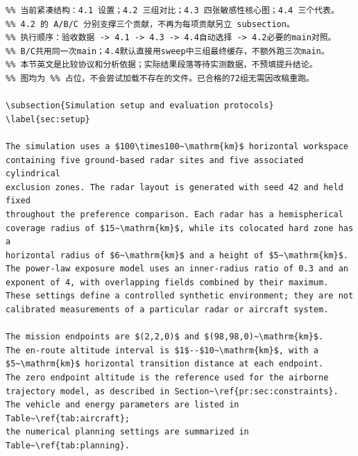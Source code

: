 \documentclass[12pt]{article}
\begin{document}
\begin{verbatim}
%% 当前紧凑结构：4.1 设置；4.2 三组对比；4.3 四张敏感性核心图；4.4 三个代表。
%% 4.2 的 A/B/C 分别支撑三个贡献，不再为每项贡献另立 subsection。
%% 执行顺序：验收数据 -> 4.1 -> 4.3 -> 4.4自动选择 -> 4.2必要的main对照。
%% B/C共用同一次main；4.4默认直接用sweep中三组最终缓存，不额外跑三次main。
%% 本节英文是比较协议和分析依据；实际结果段落等待实测数据，不预填提升结论。
%% 图均为 %% 占位，不会尝试加载不存在的文件。已合格的72组无需因改稿重跑。

\subsection{Simulation setup and evaluation protocols}
\label{sec:setup}

The simulation uses a $100\times100~\mathrm{km}$ horizontal workspace
containing five ground-based radar sites and five associated cylindrical
exclusion zones. The radar layout is generated with seed 42 and held fixed
throughout the preference comparison. Each radar has a hemispherical
coverage radius of $15~\mathrm{km}$, while its colocated hard zone has a
horizontal radius of $6~\mathrm{km}$ and a height of $5~\mathrm{km}$.
The power-law exposure model uses an inner-radius ratio of 0.3 and an
exponent of 4, with overlapping fields combined by their maximum.
These settings define a controlled synthetic environment; they are not
calibrated measurements of a particular radar or aircraft system.

The mission endpoints are $(2,2,0)$ and $(98,98,0)~\mathrm{km}$.
The en-route altitude interval is $1$--$10~\mathrm{km}$, with a
$5~\mathrm{km}$ horizontal transition distance at each endpoint.
The zero endpoint altitude is the reference used for the airborne
trajectory model, as described in Section~\ref{pr:sec:constraints}.
The vehicle and energy parameters are listed in Table~\ref{tab:aircraft};
the numerical planning settings are summarized in
Table~\ref{tab:planning}.


\end{verbatim}
\end{document}
